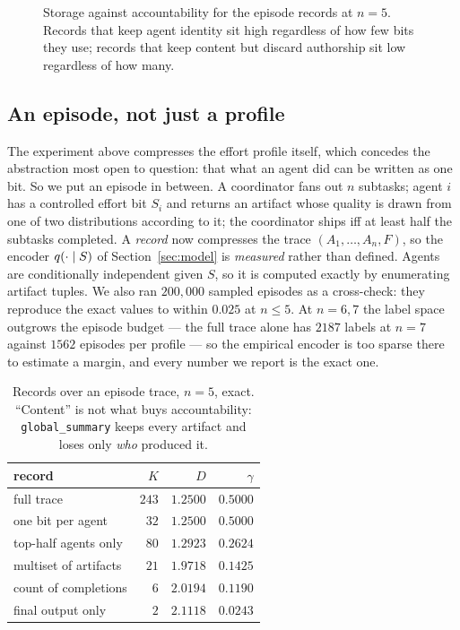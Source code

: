 \begin{figure}[t]
\centering

\caption{Storage against accountability for the episode records at $n=5$.
Records that keep agent identity sit high regardless of how few bits they
use; records that keep content but discard authorship sit low regardless of
how many.}
\label{fig:identity}
\end{figure}
\subsection{An episode, not just a profile}
\label{sec:episodes}

The experiment above compresses the effort profile itself, which concedes the
abstraction most open to question: that what an agent did can be written as one
bit. So we put an episode in between. A coordinator fans out $n$ subtasks; agent
$i$ has a controlled effort bit $S_i$ and returns an artifact whose quality is
drawn from one of two distributions according to it; the coordinator ships iff at
least half the subtasks completed. A \emph{record} now compresses the trace
$(A_1,\dots,A_n,F)$, so the encoder $q(\cdot \mid S)$ of
Section~\ref{sec:model} is \emph{measured} rather than defined. Agents are
conditionally independent given $S$, so it is computed exactly by enumerating
artifact tuples. We also ran $200{,}000$ sampled episodes as a cross-check:
they reproduce the exact values to within $0.025$ at $n \le 5$. At $n = 6,7$
the label space outgrows the episode budget --- the full trace alone has $2187$
labels at $n=7$ against $1562$ episodes per profile --- so the empirical
encoder is too sparse there to estimate a margin, and every number we report is
the exact one.

\begin{table}[t]
\centering
\caption{Records over an episode trace, $n = 5$, exact. ``Content'' is not what
buys accountability: \texttt{global\_summary} keeps every artifact and loses only
\emph{who} produced it.}
\label{tab:episodes}
\small
\begin{tabular}{@{}lrrr@{}}
\toprule
record & $K$ & $D$ & $\gamma$ \\
\midrule
full trace              & $243$ & $1.2500$ & $0.5000$ \\
one bit per agent       & $32$  & $1.2500$ & $0.5000$ \\
top-half agents only    & $80$  & $1.2923$ & $0.2624$ \\
multiset of artifacts   & $21$  & $1.9718$ & $0.1425$ \\
count of completions    & $6$   & $2.0194$ & $0.1190$ \\
final output only       & $2$   & $2.1118$ & $0.0243$ \\
\bottomrule
\end{tabular}
\end{table}

